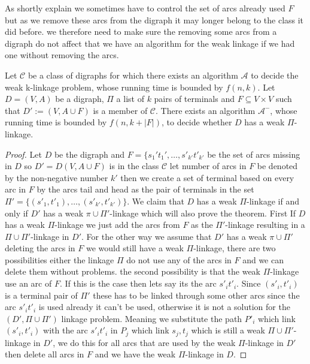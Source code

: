 As shortly explain we sometimes have to control the set of arcs already used $F$ but as we remove these arcs from the digraph it may longer belong to the class it did before. we therefore need to make sure the removing some arcs from a digraph do not affect that we have an algorithm for the weak linkage if we had one without removing the arcs.
\begin{lemma}
    Let $\mathcal{C}$ be a class of digraphs for which there exists an algorithm $\mathcal{A}$ to decide the weak k-linkage problem, whose running time is bounded by $f(n,k)$. Let $D=(V,A)$ be a digraph, $\Pi$ a list of $k$ pairs of terminals and $F\subseteq V\times V$ such that $D':= (V,A\cup F)$ is a member of $\mathcal{C}$. There exists an algorithm  $\mathcal{A}^-$, whose running time is bounded by $f(n,k+|F|)$, to decide whether $D$ has a weak $\Pi$-linkage.
    \label{lemma:deletarcs}
\end{lemma}
\begin{proof}
    Let $D$ be the digraph and $F=\lbrace s_1't_1',\dots ,s'_{k'}t'_{k'}$ be the set of arcs missing in $D$ so $D'=D(V,A\cup F)$ is in the class $\mathcal{C}$ let number of arcs in $F$ be denoted by the non-negative number $k'$ then we create a set of terminal based on every arc in $F$ by the arcs tail and head as the pair of terminals in the set $\Pi'=\lbrace (s'_1,t'_1),\dots ,(s'_{k'},t'_{k'})\rbrace$. 
    We claim that $D$ has a weak $\Pi$-linkage if and only if $D'$ has a weak $\pi \cup \Pi'$-linkage which will also prove the theorem. 
    First If $D$ has a weak $\Pi$-linkage we just add the arcs from $F$ as the $\Pi'$-linkage resulting in a $\Pi \cup \Pi'$-linkage in $D'$. 
    For the other way we assume that $D'$ has a weak $\pi \cup \Pi'$ deleting the arcs in $F$ we would still have a weak $\Pi$-linkage, there are two possibilities either the linkage $\Pi$ do not use any of the arcs in $F$ and we can delete them without problems.
    the second possibility is that the weak $\Pi$-linkage use an arc of $F$.
    If this is the case then lets say its the arc $s'_it'_i$. 
    Since $(s'_i,t'_i)$ is a terminal pair of $\Pi'$ these has to be linked through some other arcs since the arc $s'_it'_i$ is used already it can't be used, otherwise it is not a solution for the $(D',\Pi \cup \Pi')$ linkage problem.
    Meaning we substitute the path $P'_i$ which link $(s'_i,t'_i)$ with the arc $s'_it'_i$ in $P_j$ which link $s_j,t_j$ which is still a weak $\Pi \cup \Pi'$-linkage in $D'$, we do this for all arcs that are used by the weak $\Pi$-linkage in $D'$ then delete all arcs in $F$ and we have the weak $\Pi$-linkage in $D$.
\end{proof}
